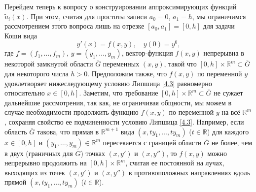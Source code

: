 Перейдем теперь к вопросу о конструировании аппроксимирующих функций $\tilde u_i(x)$. При этом, считая для простоты записи $a_0=0$, $a_1=h$,  мы ограничимся  рассмотрением этого вопроса лишь на отрезке $[a_0, a_1]=[0, h]$ для задачи Коши вида
\begin{equation}\label{4.1}
y'(x)=f(x,y), \quad y(0)=y^0,
\end{equation}
где   $f=(f_1, \ldots, f_m)$, $y=(y_1, \ldots, y_m)$, вектор-функция  $f(x,y)$  непрерывна в некоторой замкнутой  области $\bar G$ переменных $(x,y)$, такой что  $[0,h]\times\mathbb{R}^m\subset\bar G$ для  некоторого числа $h>0$. Предположим также, что   $f(x,y)$ по переменной $y$ удовлетворяет нижеследующему условию Липшица \eqref{4.3} равномерно относительно  $x\in[0,h]$. Заметим, что требование $[0,h]\times\mathbb{R}^m\subset\bar G$ не сужает дальнейшие рассмотрения, так как, не ограничивая  общности,  мы можем в случае необходимости продолжить функцию $f(x,y)$ по переменной $y$ на всё $\mathbb{R}^m$, сохраняя свойство ее подчиненности  условию Липшица \eqref{4.3}. Например, если область $\bar G$ такова, что  прямая в $\mathbb{R}^{m+1}$ вида $(x,ty_1,\ldots,ty_m)$ ($t\in\mathbb{R}$) для каждого $x\in[0,h]$ и $(y_1,\ldots,y_m)\in\mathbb{R}^{m}$ пересекается с границей области $\bar G$ не более, чем в двух (граничных для $\bar G$) точках $(x,y')$ и $(x,y'')$, то  $f(x,y)$ можно непрерывно продолжить   на $[0,h]\times\mathbb{R}^m$, считая ее  постоянной на лучах, выходящих из точек  $(x,y')$ и $(x,y'')$ в противоположных направлениях вдоль прямой $(x,ty_1,\ldots,ty_m)$ ($t\in\mathbb{R}$).


